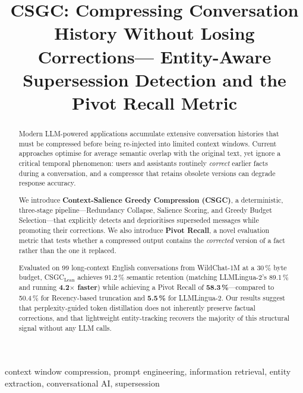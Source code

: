 \documentclass[conference]{IEEEtran}
\newcommand{\csgc}{\textsc{CSGC}}
\newcommand{\lean}{\textsc{CSGC}$_{\text{Lean}}$}
\begin{document}
\title{CSGC: Compressing Conversation History Without Losing Corrections---
  Entity-Aware Supersession Detection and the Pivot Recall Metric}

\author{%
}

\maketitle

\begin{abstract}
Modern LLM-powered applications accumulate extensive conversation histories
that must be compressed before being re-injected into limited context windows.
Current approaches optimise for average semantic overlap with the original
text, yet ignore a critical temporal phenomenon: users and assistants
routinely \emph{correct} earlier facts during a conversation, and a
compressor that retains obsolete versions can degrade response accuracy.

We introduce \textbf{Context-Salience Greedy Compression (\csgc{})}, a
deterministic, three-stage pipeline---Redundancy Collapse, Salience Scoring,
and Greedy Budget Selection---that explicitly detects and deprioritises
superseded messages while promoting their corrections.
We also introduce \textbf{Pivot Recall}, a novel evaluation metric that tests
whether a compressed output contains the \emph{corrected} version of a fact
rather than the one it replaced.

Evaluated on 99 long-context English conversations from WildChat-1M at a
30\,\% byte budget, \lean{} achieves 91.2\,\% semantic retention
(matching LLMLingua-2's 89.1\,\% and running \textbf{4.2$\times$ faster})
while achieving a Pivot Recall of \textbf{58.3\,\%}---compared to 50.4\,\%
for Recency-based truncation and \textbf{5.5\,\%} for
LLMLingua-2. Our results suggest that perplexity-guided token distillation
does not inherently preserve factual corrections, and that lightweight entity-tracking recovers
the majority of this structural signal without any LLM calls.
\end{abstract}

\begin{IEEEkeywords}
context window compression, prompt engineering, information retrieval,
entity extraction, conversational AI, supersession
\end{IEEEkeywords}
\end{document}
